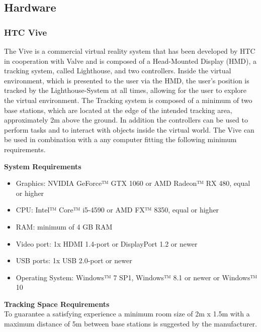 \subsection{Hardware}\label{Hardware}
\subsubsection{HTC Vive}
The Vive is a commercial virtual reality system that has been developed by HTC in cooperation with Valve and is composed of a Head-Mounted Display (HMD), a tracking system, called Lighthouse, and two controllers. Inside the virtual environment, which is presented to the user via the HMD, the user's position is tracked by the Lighthouse-System at all times, allowing for the user to explore the virtual environment. The Tracking system is composed of a minimum of two base stations, which are located at the edge of the intended tracking area, approximately 2m above the ground. In addition the controllers can be used to perform tasks and to interact with objects inside the virtual world. The Vive can be used in combination with a any computer fitting the following minimum requirements. 
  
\textbf{System Requirements}
\begin{itemize}
\item Graphics: NVIDIA GeForce™ GTX 1060 or AMD Radeon™ RX 480, equal or higher
\item CPU: Intel™ Core™ i5-4590 or AMD FX™ 8350, equal or higher
\item RAM: minimum of 4 GB RAM
\item Video port: 1x HDMI 1.4-port or DisplayPort 1.2 or newer
\item USB ports: 1x USB 2.0-port or newer
\item Operating System: Windows™ 7 SP1, Windows™ 8.1 or newer or Windows™ 10
\end{itemize}

\textbf{Tracking Space Requirements}\\[10pt]
To guarantee a satisfying experience a minimum room size of 2m x 1.5m with a maximum distance of 5m between base stations is suggested by the manufacturer. 
